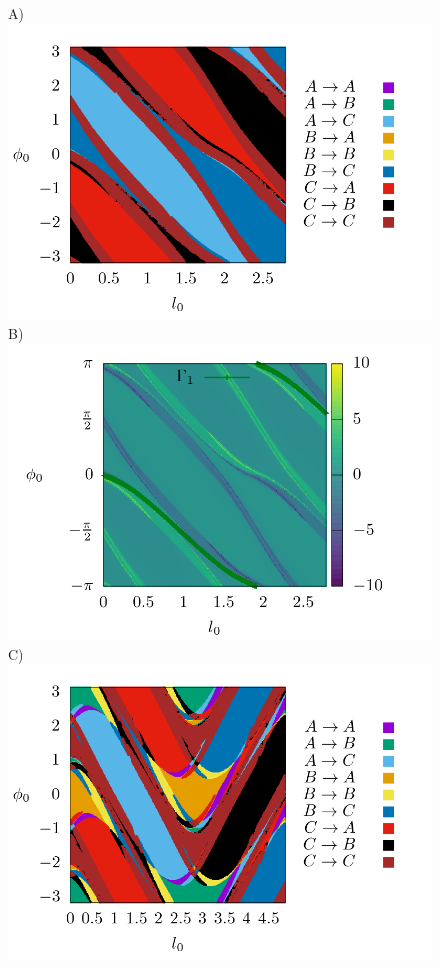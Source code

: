 \documentclass[10pt,aps,onecolumn,superscriptaddress]{revtex4-2}
\begin{document}
\begin{figure}[htbp]
	A)\includegraphics[scale=0.35]{fate_map_ds_gamma1E_0027.png}
	B)\includegraphics[scale=0.35]{ld_action_ds_gamma1_E_0027.png}
	C)\includegraphics[scale=0.35]{fate_map_ds_gamma2E_0027.png}

\end{figure}
\end{document}
